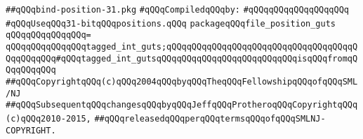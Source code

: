 \label{src/lib/std/src/bind-position-31.pkg}
\verb|##qQQqbind-position-31.pkg|\newline
\newline
\verb|#qQQqCompiledqQQqby:|\newline
\verb|#qQQqqQQqqQQqqQQqqQQq|\newline
\newline
\verb|#qQQqUseqQQq31-bitqQQqpositions.qQQq|\newline
\newline
\verb|packageqQQqfile_position_guts|\newline
\verb|qQQqqQQqqQQqqQQq=|\newline
\verb|qQQqqQQqqQQqqQQqtagged_int_guts;qQQqqQQqqQQqqQQqqQQqqQQqqQQqqQQqqQQqqQQqqQQqqQQq#qQQqtagged_int_gutsqQQqqQQqqQQqqQQqqQQqqQQqqQQqisqQQqfromqQQqqQQqqQQq|\newline
\newline
\newline
\newline
\verb|##qQQqCopyrightqQQq(c)qQQq2004qQQqbyqQQqTheqQQqFellowshipqQQqofqQQqSML/NJ|\newline
\verb|##qQQqSubsequentqQQqchangesqQQqbyqQQqJeffqQQqProtheroqQQqCopyrightqQQq(c)qQQq2010-2015,|\newline
\verb|##qQQqreleasedqQQqperqQQqtermsqQQqofqQQqSMLNJ-COPYRIGHT.|\newline

